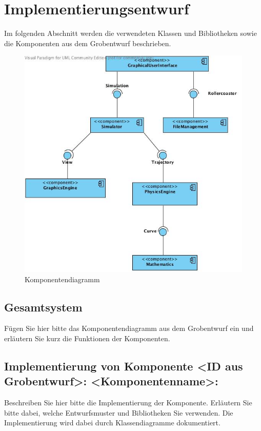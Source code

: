 \chapter{Implementierungsentwurf}
Im folgenden Abschnitt werden die verwendeten Klassen und Bibliotheken sowie die Komponenten aus dem Grobentwurf beschrieben.

\begin{figure}[!h]
	\includegraphics[width=0.8\linewidth]{bilder/components.jpg}
\caption{Komponentendiagramm}
\end{figure}


\section{Gesamtsystem}
Fügen Sie hier bitte das Komponentendiagramm aus dem Grobentwurf ein und
erläutern Sie kurz die Funktionen der Komponenten.
\section{Implementierung von Komponente
         <ID aus Grobentwurf>: <Komponentenname>:}

Beschreiben Sie hier bitte die Implementierung der Komponente. Erläutern Sie
bitte dabei, welche Entwurfsmuster und Bibliotheken Sie verwenden. Die
Implementierung wird dabei durch Klassendiagramme dokumentiert.

